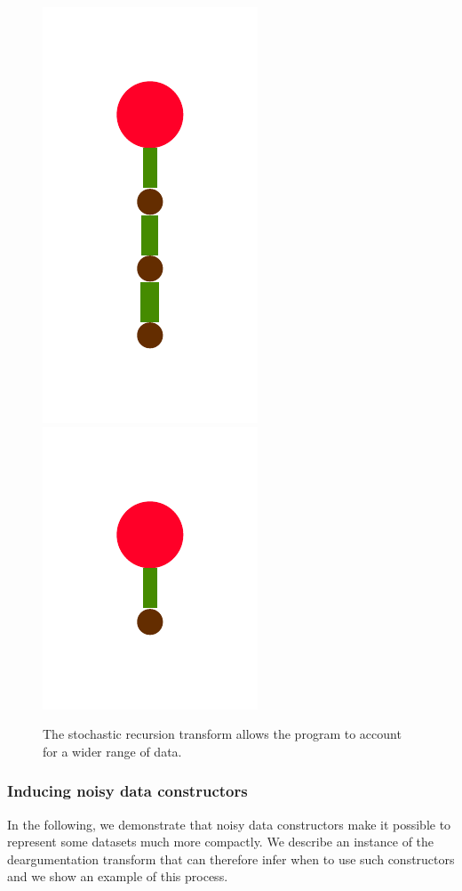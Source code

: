 \documentclass[a4paper,10pt]{article}
\begin{document}
\begin{figure}
{    \includegraphics[scale=.2]{./figures/4-2-3-recursion-post-7.pdf}
    \includegraphics[scale=.2]{./figures/4-2-3-recursion-post-8.pdf}
    \label{fig:rec-transformed}    
    }
  \caption{The stochastic recursion transform allows the program to account for a wider range of data.}
  \label{fig:rec}
\end{figure}


\subsubsection{Inducing noisy data constructors}

In the following, we demonstrate that noisy data constructors make it possible to represent some datasets much more compactly. We describe an instance of the deargumentation transform that can therefore infer when to use such constructors and we show an example of this process.
\end{document}
